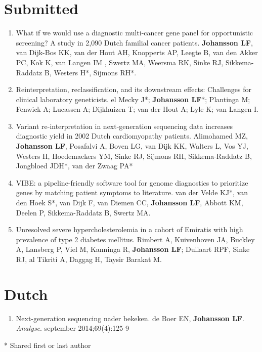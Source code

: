 \begin{appendices}
	\section*{Submitted}
	\begin{enumerate}
		\item What if we would use a diagnostic multi-cancer gene panel for opportunistic screening? A study in 2,090 Dutch familial cancer patients.  \textbf{Johansson LF}, van Dijk-Bos KK, van der Hout AH, Knopperts AP, Leegte B, van den Akker PC, Kok K, van Langen IM , Swertz MA, Weersma RK, Sinke RJ, Sikkema-Raddatz B, Westers H*,  Sijmons RH*.
		\item Reinterpretation, reclassification, and its downstream effects: Challenges for clinical laboratory geneticists. el Mecky J*; \textbf{Johansson LF}*; Plantinga M; Fenwick A; Lucassen A; Dijkhuizen T; van der Hout A; Lyle K; van Langen I.
		\item Variant re-interpretation in next-generation sequencing data increases diagnostic yield in 2002 Dutch cardiomyopathy patients. Alimohamed MZ, \textbf{Johansson LF}, Posafalvi A, Boven LG, van Dijk KK, Walters L, Vos YJ, Westers H, Hoedemaekers YM, Sinke RJ, Sijmons RH, Sikkema-Raddatz B, Jongbloed JDH*, van der Zwaag PA*
		\item VIBE: a pipeline-friendly software tool for genome diagnostics to prioritize genes by matching patient symptoms to literature. van der Velde KJ*, van den Hoek S*, van Dijk F, van Diemen CC, \textbf{Johansson LF}, Abbott KM, Deelen P, Sikkema-Raddatz B, Swertz MA. 
		\item Unresolved severe hypercholesterolemia in a cohort of Emiratis with high prevalence of type 2 diabetes mellitus. Rimbert A, Kuivenhoven JA, Buckley A, Lansberg P, Viel M, Kanninga R, \textbf{Johansson LF}; Dullaart RPF, Sinke RJ, al Tikriti A, Daggag H, Taysir Barakat M.
	\end{enumerate}
	
	\section*{Dutch}
	\begin{enumerate}
		\item Next-generation sequencing nader bekeken. de Boer EN, \textbf{Johansson LF}. \textsl{Analyse}. september 2014;69(4):125-9 \\
	\end{enumerate}
	
	* Shared first or last author
	

\end{appendices}
